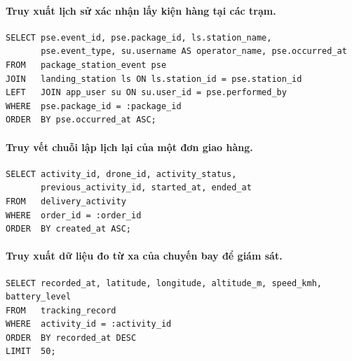 \paragraph{Truy xuất lịch sử xác nhận lấy kiện hàng tại các trạm.}
\begin{verbatim}
SELECT pse.event_id, pse.package_id, ls.station_name,
       pse.event_type, su.username AS operator_name, pse.occurred_at
FROM   package_station_event pse
JOIN   landing_station ls ON ls.station_id = pse.station_id
LEFT   JOIN app_user su ON su.user_id = pse.performed_by
WHERE  pse.package_id = :package_id
ORDER  BY pse.occurred_at ASC;
\end{verbatim}

\paragraph{Truy vết chuỗi lập lịch lại của một đơn giao hàng.}
\begin{verbatim}
SELECT activity_id, drone_id, activity_status,
       previous_activity_id, started_at, ended_at
FROM   delivery_activity
WHERE  order_id = :order_id
ORDER  BY created_at ASC;
\end{verbatim}

\paragraph{Truy xuất dữ liệu đo từ xa của chuyến bay để giám sát.}
\begin{verbatim}
SELECT recorded_at, latitude, longitude, altitude_m, speed_kmh, battery_level
FROM   tracking_record
WHERE  activity_id = :activity_id
ORDER  BY recorded_at DESC
LIMIT  50;
\end{verbatim}
